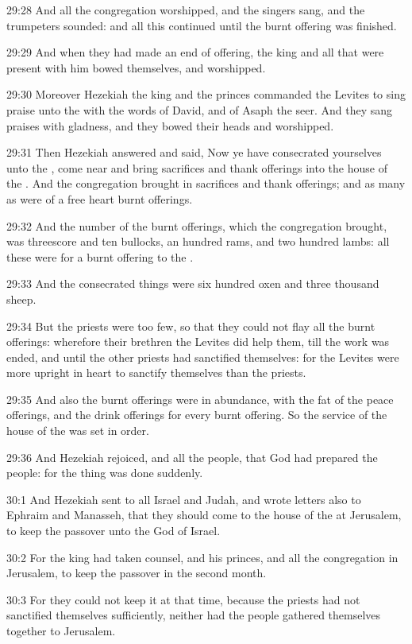 29:28 And all the congregation worshipped, and the singers sang, and
the trumpeters sounded: and all this continued until the burnt
offering was finished.

29:29 And when they had made an end of offering, the king and all that
were present with him bowed themselves, and worshipped.

29:30 Moreover Hezekiah the king and the princes commanded the Levites
to sing praise unto the \LORD with the words of David, and of Asaph the
seer. And they sang praises with gladness, and they bowed their heads
and worshipped.

29:31 Then Hezekiah answered and said, Now ye have consecrated
yourselves unto the \LORD, come near and bring sacrifices and thank
offerings into the house of the \LORD. And the congregation brought in
sacrifices and thank offerings; and as many as were of a free heart
burnt offerings.

29:32 And the number of the burnt offerings, which the congregation
brought, was threescore and ten bullocks, an hundred rams, and two
hundred lambs: all these were for a burnt offering to the \LORD.

29:33 And the consecrated things were six hundred oxen and three
thousand sheep.

29:34 But the priests were too few, so that they could not flay all
the burnt offerings: wherefore their brethren the Levites did help
them, till the work was ended, and until the other priests had
sanctified themselves: for the Levites were more upright in heart to
sanctify themselves than the priests.

29:35 And also the burnt offerings were in abundance, with the fat of
the peace offerings, and the drink offerings for every burnt offering.
So the service of the house of the \LORD was set in order.

29:36 And Hezekiah rejoiced, and all the people, that God had prepared
the people: for the thing was done suddenly.

30:1 And Hezekiah sent to all Israel and Judah, and wrote letters also
to Ephraim and Manasseh, that they should come to the house of the
\LORD at Jerusalem, to keep the passover unto the \LORD God of Israel.

30:2 For the king had taken counsel, and his princes, and all the
congregation in Jerusalem, to keep the passover in the second month.

30:3 For they could not keep it at that time, because the priests had
not sanctified themselves sufficiently, neither had the people
gathered themselves together to Jerusalem.

